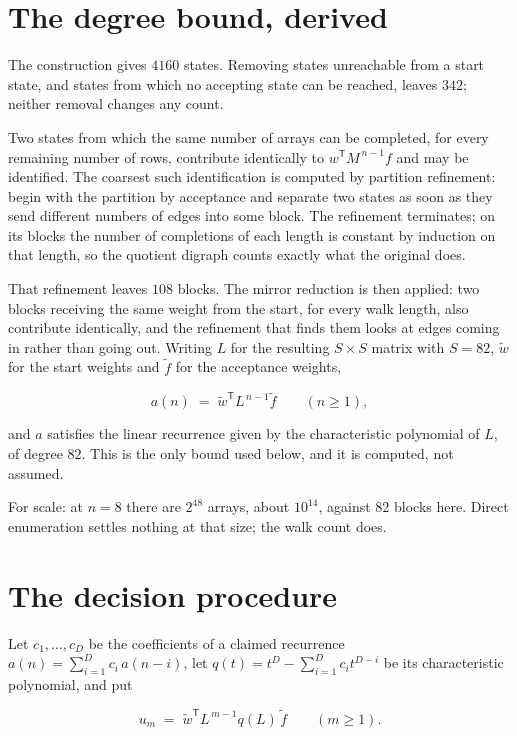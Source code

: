 \documentclass[11pt]{article}
\theoremstyle{definition}
\begin{document}
\section{The degree bound, derived}

The construction gives $4160$ states. Removing states unreachable from a start state, and states from which no accepting state can be reached, leaves $342$; neither removal changes any count.

Two states from which the same number of arrays can be completed, for every remaining number of rows, contribute identically to $w^{\mathsf T}M^{\,n-1}f$ and may be identified. The coarsest such identification is computed by partition refinement: begin with the partition by acceptance and separate two states as soon as they send different numbers of edges into some block. The refinement terminates; on its blocks the number of completions of each length is constant by induction on that length, so the quotient digraph counts exactly what the original does.

That refinement leaves $108$ blocks. The mirror reduction is then applied: two blocks receiving the same weight from the start, for every walk length, also contribute identically, and the refinement that finds them looks at edges coming in rather than going out. Writing $L$ for the resulting $S \times S$ matrix with $S = 82$, $\tilde w$ for the start weights and $\tilde f$ for the acceptance weights,

\[a(n) \;=\; \tilde w^{\mathsf T} L^{\,n-1} \tilde f \qquad (n \ge 1),\]

and $a$ satisfies the linear recurrence given by the characteristic polynomial of $L$, of degree $82$. This is the only bound used below, and it is computed, not assumed.

For scale: at $n = 8$ there are $2^{48}$ arrays, about $10^{14}$, against $82$ blocks here. Direct enumeration settles nothing at that size; the walk count does.

\section{The decision procedure}

Let $c_1,\dots,c_D$ be the coefficients of a claimed recurrence $a(n) = \sum_{i=1}^{D} c_i\,a(n-i)$, let $q(t) = t^{D} - \sum_{i=1}^{D} c_i t^{D-i}$ be its characteristic polynomial, and put

\[u_m \;=\; \tilde w^{\mathsf T} L^{\,m-1} q(L)\,\tilde f \qquad (m \ge 1).\]
\end{document}

